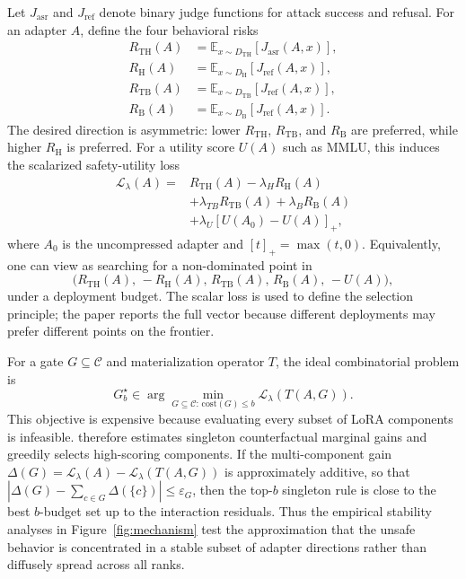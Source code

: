 Let $J_{\mathrm{asr}}$ and $J_{\mathrm{ref}}$ denote binary judge functions for attack success and refusal.
For an adapter $A$, define the four behavioral risks
\[
\begin{aligned}
R_{\mathrm{TH}}(A) &= \mathbb{E}_{x\sim D_{\mathrm{TH}}}
    [J_{\mathrm{asr}}(A,x)], \\
R_{\mathrm{H}}(A) &= \mathbb{E}_{x\sim D_{\mathrm{H}}}
    [J_{\mathrm{ref}}(A,x)], \\
R_{\mathrm{TB}}(A) &= \mathbb{E}_{x\sim D_{\mathrm{TB}}}
    [J_{\mathrm{ref}}(A,x)], \\
R_{\mathrm{B}}(A) &= \mathbb{E}_{x\sim D_{\mathrm{B}}}
    [J_{\mathrm{ref}}(A,x)] .
\end{aligned}
\]
The desired direction is asymmetric: lower $R_{\mathrm{TH}}$, $R_{\mathrm{TB}}$, and $R_{\mathrm{B}}$ are preferred, while higher $R_{\mathrm{H}}$ is preferred.
For a utility score $U(A)$ such as MMLU, this induces the scalarized safety-utility loss
\[
\begin{aligned}
    \mathcal{L}_{\lambda}(A)
    ={}& R_{\mathrm{TH}}(A) - \lambda_H R_{\mathrm{H}}(A) \\
    &+ \lambda_{TB} R_{\mathrm{TB}}(A)
    + \lambda_B R_{\mathrm{B}}(A) \\
    &+ \lambda_U [U(A_0)-U(A)]_+ ,
\end{aligned}
\]
where $A_0$ is the uncompressed adapter and $[t]_+=\max(t,0)$.
Equivalently, one can view \sac{} as searching for a non-dominated point in
\[
    \big(R_{\mathrm{TH}}(A),\,-R_{\mathrm{H}}(A),\,
    R_{\mathrm{TB}}(A),\,R_{\mathrm{B}}(A),\,-U(A)\big),
\]
under a deployment budget.
The scalar loss is used to define the selection principle; the paper reports the full vector because different deployments may prefer different points on the frontier.

For a gate $G\subseteq\mathcal{C}$ and materialization operator $T$, the ideal combinatorial problem is
\[
    G_b^\star \in
    \arg\min_{G\subseteq\mathcal{C}:\,\mathrm{cost}(G)\le b}
    \mathcal{L}_{\lambda}\!\left(T(A,G)\right).
\]
This objective is expensive because evaluating every subset of LoRA components is infeasible.
\sac{} therefore estimates singleton counterfactual marginal gains and greedily selects high-scoring components.
If the multi-component gain
$\Delta(G)=\mathcal{L}_{\lambda}(A)-\mathcal{L}_{\lambda}(T(A,G))$
is approximately additive, so that
$|\Delta(G)-\sum_{c\in G}\Delta(\{c\})|\le \varepsilon_G$,
then the top-$b$ singleton rule is close to the best $b$-budget set up to the interaction residuals.
Thus the empirical stability analyses in Figure~\ref{fig:mechanism} test the approximation that the unsafe behavior is concentrated in a stable subset of adapter directions rather than diffusely spread across all ranks.

